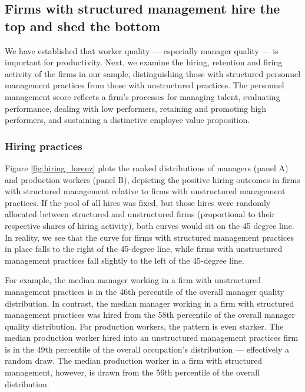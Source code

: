 \subsection{Firms with structured management hire the top and shed the bottom}
We have established that worker quality --- especially manager quality --- is important for productivity. Next, we examine the hiring, retention and firing activity of the firms in our sample, distinguishing those with structured personnel management practices from those with unstructured practices. The personnel management score reflects a firm's processes for managing talent, evaluating performance, dealing with low performers, retaining and promoting high performers, and sustaining a distinctive employee value proposition. %

\subsubsection{Hiring practices}
 
Figure \ref{fig:hiring_lorenz} plots the ranked distributions of managers (panel A) and production workers (panel B), depicting the positive hiring outcomes in firms with structured management relative to firms with unstructured management practices. If the pool of all hires was fixed, but those hires were randomly allocated between structured and unstructured firms (proportional to their respective shares of hiring activity), both curves would sit on the 45 degree line. In reality, we see that the curve for firms with structured management practices in place falls to the right of the 45-degree line, while firms with unstructured management practices fall slightly to the left of the 45-degree line. 

For example, the median manager working in a firm with unstructured management practices is in the 46th percentile of the overall manager quality distribution. In contrast, the median manager working in a firm with structured management practices was hired from the 58th percentile of the overall manager quality distribution. For production workers, the pattern is even starker. The median production worker hired into an unstructured management practices firm is in the 49th percentile of the overall occupation's distribution --- effectively a random draw. The median production worker in a firm with structured management, however, is drawn from the 56th percentile of the overall distribution. 

